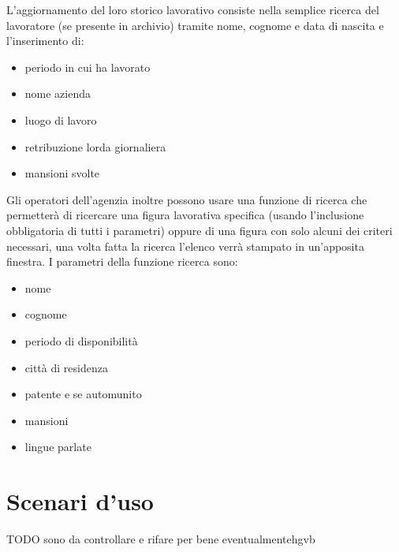 \underline{}\documentclass{article}
\begin{document}
    L'aggiornamento del loro storico lavorativo consiste nella semplice ricerca del lavoratore (se presente in archivio) tramite nome, cognome e data di nascita e l'inserimento di:

    \begin{itemize}
        \item periodo in cui ha lavorato
        \item nome azienda 
        \item luogo di lavoro
        \item retribuzione lorda giornaliera
        \item mansioni svolte
    \end{itemize}

    Gli operatori dell'agenzia inoltre possono usare una funzione di ricerca che permetterà di ricercare una figura lavorativa specifica (usando l'inclusione obbligatoria di tutti i parametri) oppure di una figura con solo alcuni dei criteri necessari, una volta fatta la ricerca l'elenco verrà stampato in un'apposita finestra. I parametri della funzione ricerca sono:

    \begin{itemize}
        \item nome
        \item cognome
        \item periodo di disponibilità
        \item città di residenza
        \item patente e se automunito
        \item mansioni
        \item lingue parlate
    \end{itemize}

    \section{Scenari d'uso}

    TODO sono da controllare e rifare per bene eventualmentehgvb
\end{document}
